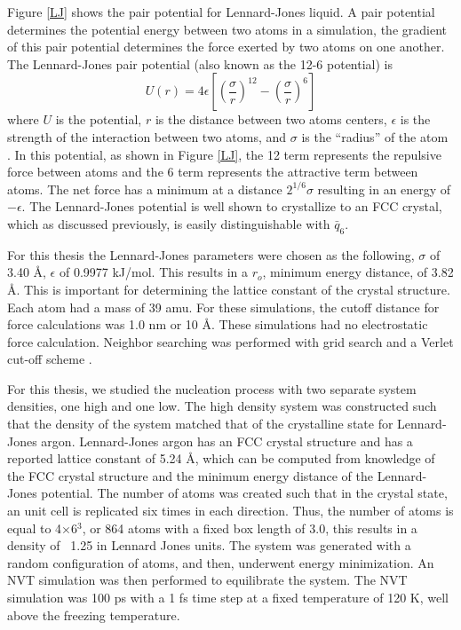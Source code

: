 Figure \ref{LJ} shows the pair potential for Lennard-Jones liquid.  A pair potential determines the potential energy between two atoms in a simulation, the gradient of this pair potential determines the force exerted by two atoms on one another.  The Lennard-Jones pair potential (also known as the 12-6 potential) is
\begin{equation}
U(r) = 4\epsilon\left[\left(\frac{\sigma}{r}\right)^{12} - \left(\frac{\sigma}{r}\right)^6\right]
\end{equation}
where $U$ is the potential, $r$ is the distance between two atoms centers, $\epsilon$ is the strength of the interaction between two atoms, and $\sigma$ is the ``radius'' of the atom \cite{Jones463}.  In this potential, as shown in Figure \ref{LJ}, the 12 term represents the repulsive force between atoms and the 6 term represents the attractive term between atoms.  The net force has a minimum at a distance $2^{1/6}\sigma$ resulting in an energy of $-\epsilon$.   The Lennard-Jones potential is well shown to crystallize to an FCC crystal, which as discussed previously, is easily distinguishable with $\bar{q}_6$.

For this thesis the Lennard-Jones parameters were chosen as the following, $\sigma$ of 3.40 \AA, $\epsilon$ of 0.9977 kJ/mol.  This results in a $r_o$, minimum energy distance, of 3.82 \AA.  This is important for determining the lattice constant of the crystal structure.  Each atom had a mass of 39 amu.  For these simulations, the cutoff distance for force calculations was 1.0 nm or 10 \AA.  These simulations had no electrostatic force calculation.  Neighbor searching was performed with grid search and a Verlet cut-off scheme \cite{Verlet1967}.  

For this thesis, we studied the nucleation process with two separate system densities, one high and one low.  The high density system was constructed such that the density of the system matched that of the crystalline state for Lennard-Jones argon.  Lennard-Jones argon has an FCC crystal structure and has a reported lattice constant of 5.24 \AA, which can be computed from knowledge of the FCC crystal structure and the minimum energy distance of the Lennard-Jones potential.  %
The number of atoms was created such that in the crystal state, an unit cell is replicated six times in each direction.  Thus, the number of atoms is equal to 4$\times$6$^3$, or 864 atoms with a fixed box length of 3.0, this results in a density of ~1.25 in Lennard Jones units.  The system was generated with a random configuration of atoms, and then, underwent energy minimization.  An NVT simulation was then performed to equilibrate the system.  The NVT simulation was 100 ps with a 1 fs time step at a fixed temperature of 120 K, well above the freezing temperature.

